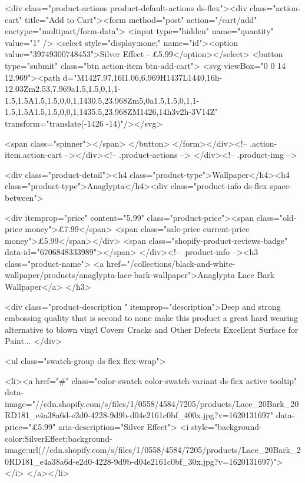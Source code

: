 {{{{{{{<div class="product-actions product-default-actions ds-flex"><div class="action-cart" title="Add to Cart"><form method="post" action="/cart/add" enctype="multipart/form-data">
            <input type="hidden" name="quantity" value="1" />
            <select style="display:none;" name="id"><option value="39749300748453">Silver Effect - £5.99</option></select>
            <button type="submit" class="btn action-item btn-add-cart">
              <svg viewBox="0 0 14 12.969"><path d="M1427.97,16l1.06,6.969H1437L1440,16h-12.03Zm2.53,7.969a1.5,1.5,0,1,1-1.5,1.5A1.5,1.5,0,0,1,1430.5,23.968Zm5,0a1.5,1.5,0,1,1-1.5,1.5A1.5,1.5,0,0,1,1435.5,23.968ZM1426,14h3v2h-3V14Z" transform="translate(-1426 -14)"/></svg>

              <span class="spinner"></span>
            </button>
          </form></div><!-- .action-item.action-cart --></div><!-- .product-actions -->
</div><!-- .product-img -->

<div class="product-detail"><h4 class="product-type">Wallpaper</h4><h4 class="product-type">Anaglypta</h4><div class="product-info ds-flex space-between">
    
<div itemprop="price" content="5.99" class="product-price"><span class="old-price money">£7.99</span>
    <span class="sale-price current-price money">£5.99</span></div>
    <span class="shopify-product-reviews-badge" data-id="6706848333989"></span>
  </div><!-- .product-info --><h3 class="product-name">
      <a href="/collections/black-and-white-wallpaper/products/anaglypta-lace-bark-wallpaper">Anaglypta Lace Bark Wallpaper</a>
    </h3>
    
<div class="product-description " itemprop="description">Deep and strong embossing quality that is second to none make this product a great hard wearing alternative to blown vinyl Covers Cracks and Other Defects Excellent Surface for Paint...
</div>



<ul class="swatch-group ds-flex flex-wrap">
        
<li><a href="#" class="color-swatch color-swatch-variant ds-flex active tooltip" data-image="//cdn.shopify.com/s/files/1/0558/4584/7205/products/Lace_20Bark_20RD181_e4a38a6d-e2d0-4228-9d9b-d04e2161c0bf_400x.jpg?v=1620131697" data-price="£5.99" aria-description="Silver Effect">
              <i style="background-color:SilverEffect;background-image:url(//cdn.shopify.com/s/files/1/0558/4584/7205/products/Lace_20Bark_20RD181_e4a38a6d-e2d0-4228-9d9b-d04e2161c0bf_30x.jpg?v=1620131697)"></i>
            </a></li>

}}}}}}}
